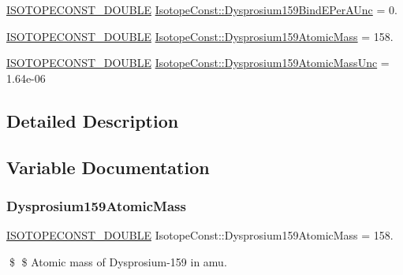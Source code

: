 \begin{DoxyCompactItemize}
\item 
\mbox{\hyperlink{group___isotope_const-_macros_ga8f45a7272ce02c0b4c65c44636ed719a}{I\+S\+O\+T\+O\+P\+E\+C\+O\+N\+S\+T\+\_\+\+D\+O\+U\+B\+LE}} \mbox{\hyperlink{group___isotope_const-_dysprosium-_dy159_ga3043d803ec7ffc88c2d6643f876a777d}{Isotope\+Const\+::\+Dysprosium159\+Bind\+E\+Per\+A\+Unc}} = 0.
\item 
\mbox{\hyperlink{group___isotope_const-_macros_ga8f45a7272ce02c0b4c65c44636ed719a}{I\+S\+O\+T\+O\+P\+E\+C\+O\+N\+S\+T\+\_\+\+D\+O\+U\+B\+LE}} \mbox{\hyperlink{group___isotope_const-_dysprosium-_dy159_ga3163c9a2534d840e0ef432831f47f232}{Isotope\+Const\+::\+Dysprosium159\+Atomic\+Mass}} = 158.
\item 
\mbox{\hyperlink{group___isotope_const-_macros_ga8f45a7272ce02c0b4c65c44636ed719a}{I\+S\+O\+T\+O\+P\+E\+C\+O\+N\+S\+T\+\_\+\+D\+O\+U\+B\+LE}} \mbox{\hyperlink{group___isotope_const-_dysprosium-_dy159_ga3f44073f904d69382094662540e36c8b}{Isotope\+Const\+::\+Dysprosium159\+Atomic\+Mass\+Unc}} = 1.\+64e-\/06
\end{DoxyCompactItemize}


\subsection{Detailed Description}


\subsection{Variable Documentation}
\mbox{\label{group___isotope_const-_dysprosium-_dy159_ga3163c9a2534d840e0ef432831f47f232}} 
\subsubsection{\texorpdfstring{Dysprosium159\+Atomic\+Mass}{Dysprosium159AtomicMass}}
{\footnotesize\ttfamily \mbox{\hyperlink{group___isotope_const-_macros_ga8f45a7272ce02c0b4c65c44636ed719a}{I\+S\+O\+T\+O\+P\+E\+C\+O\+N\+S\+T\+\_\+\+D\+O\+U\+B\+LE}} Isotope\+Const\+::\+Dysprosium159\+Atomic\+Mass = 158.}

\$ \$ Atomic mass of Dysprosium-\/159 in amu. \mbox{\label{group___isotope_const-_dysprosium-_dy159_ga3f44073f904d69382094662540e36c8b}} 
